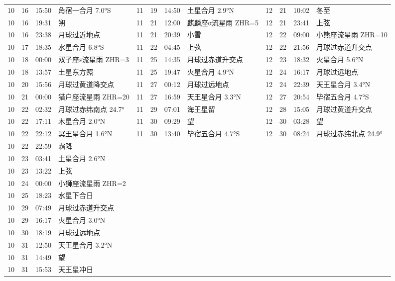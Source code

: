 \begin{tabular}{llll|llll|llll}
10 & 16 & 15:50 & 角宿一合月 7.0°S & 11 & 19 & 14:50 & 土星合月 2.9°N & 12 & 21 & 10:02 & 冬至 \tabularnewline
10 & 16 & 19:31 & 朔 & 11 & 21 & 12:00 & 麒麟座α流星雨 ZHR=5 & 12 & 21 & 23:41 & 上弦 \tabularnewline
10 & 16 & 23:38 & 月球过近地点 & 11 & 21 & 20:39 & 小雪 & 12 & 22 & 09:00 & 小熊座流星雨 ZHR=10 \tabularnewline
10 & 17 & 18:35 & 水星合月 6.8°S & 11 & 22 & 04:45 & 上弦 & 12 & 22 & 21:56 & 月球过赤道升交点 \tabularnewline
10 & 18 & 00:00 & 双子座ε流星雨 ZHR=3 & 11 & 25 & 14:35 & 月球过赤道升交点 & 12 & 23 & 18:32 & 火星合月 5.6°N \tabularnewline
10 & 18 & 13:57 & 土星东方照 & 11 & 25 & 19:47 & 火星合月 4.9°N & 12 & 24 & 16:17 & 月球过远地点 \tabularnewline
10 & 20 & 15:56 & 月球过黄道降交点 & 11 & 27 & 00:12 & 月球过远地点 & 12 & 24 & 22:39 & 天王星合月 3.4°N \tabularnewline
10 & 21 & 00:00 & 猎户座流星雨 ZHR=20 & 11 & 27 & 16:59 & 天王星合月 3.3°N & 12 & 27 & 20:54 & 毕宿五合月 4.7°S \tabularnewline
10 & 22 & 02:32 & 月球过赤纬南点 24.7° & 11 & 29 & 07:01 & 海王星留 & 12 & 28 & 15:05 & 月球过黄道升交点 \tabularnewline
10 & 22 & 17:11 & 木星合月 2.0°N & 11 & 30 & 09:29 & 望 & 12 & 30 & 03:28 & 望 \tabularnewline
10 & 22 & 22:12 & 冥王星合月 1.6°N & 11 & 30 & 13:40 & 毕宿五合月 4.7°S & 12 & 30 & 08:24 & 月球过赤纬北点 24.9° \tabularnewline
10 & 22 & 22:59 & 霜降 &  &  &  &  &  &  &  &  \tabularnewline
10 & 23 & 03:41 & 土星合月 2.6°N &  &  &  &  &  &  &  &  \tabularnewline
10 & 23 & 13:22 & 上弦 &  &  &  &  &  &  &  &  \tabularnewline
10 & 24 & 00:00 & 小狮座流星雨 ZHR=2 &  &  &  &  &  &  &  &  \tabularnewline
10 & 25 & 18:23 & 水星下合日 &  &  &  &  &  &  &  &  \tabularnewline
10 & 29 & 07:49 & 月球过赤道升交点 &  &  &  &  &  &  &  &  \tabularnewline
10 & 29 & 16:17 & 火星合月 3.0°N &  &  &  &  &  &  &  &  \tabularnewline
10 & 30 & 18:19 & 月球过远地点 &  &  &  &  &  &  &  &  \tabularnewline
10 & 31 & 12:50 & 天王星合月 3.2°N &  &  &  &  &  &  &  &  \tabularnewline
10 & 31 & 14:49 & 望 &  &  &  &  &  &  &  &  \tabularnewline
10 & 31 & 15:53 & 天王星冲日 &  &  &  &  &  &  &  &  \tabularnewline
\hline \end{tabular}
